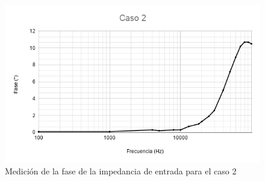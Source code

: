 \begin{figure}[H]
\begin{centering}
\includegraphics[scale=0.5]{../Ex1/iA/Resources1a/zinpp2_med}
\par\end{centering}
\caption{Medición de la fase de la impedancia de entrada para el caso 2}

\end{figure}

